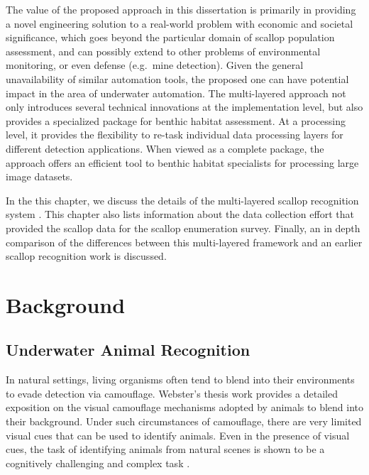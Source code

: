 The value of the proposed approach in this dissertation is primarily in  providing a novel engineering solution to a real-world problem with economic
and societal significance, which goes beyond the particular domain of scallop population
assessment, and can possibly extend to other problems of environmental monitoring,
or even defense (e.g.\ mine detection).  
Given the general unavailability of similar automation tools, the proposed one
can have potential impact in the area of underwater automation.  
The multi-layered approach not only introduces several technical innovations at 
the implementation level, 
but also provides a specialized package for benthic habitat assessment. 
At a processing level, it provides the flexibility to re-task individual 
data processing layers for different detection applications.
When viewed as a complete package, the approach
offers an efficient tool to benthic habitat specialists for processing 
large image datasets.

In the this chapter, we discuss the details of the multi-layered scallop recognition system  
\cite{prasanna_med, prasanna_aslo, prasanna_igi}. This chapter also lists information about the data collection effort that provided the scallop data for the scallop enumeration survey. Finally, an in depth comparison of the differences between this multi-layered framework and an earlier scallop recognition work \cite{dawkings13} is discussed.

\section{Background}

\subsection{Underwater Animal Recognition}
\label{sec:animal_lit}

In natural settings, living organisms often tend to blend into their environments to evade detection via camouflage. Webster's thesis work \cite{webster} provides a detailed exposition on the visual camouflage mechanisms adopted by animals to blend into their background. Under such circumstances of camouflage, there are very limited visual cues that can be used to identify animals. Even in the presence of visual cues, the task of identifying animals from natural scenes is shown to be a cognitively challenging and complex task \cite{wichmann}.


